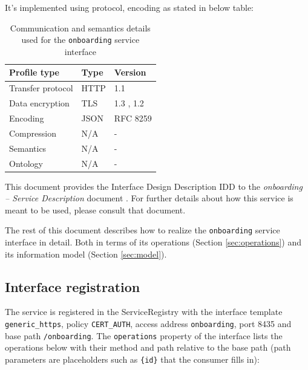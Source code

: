 \documentclass[a4paper]{arrowhead}
\begin{document}
It's implemented using protocol, encoding as stated in below table:
\begin{table}[ht!]
  \centering
  \begin{tabular}{|l|l|l|}
    \hline
    \rowcolor{gray!33} Profile type & Type & Version \\ \hline
    Transfer protocol & HTTP & 1.1 \cite{rfc9112} \\ \hline
    Data encryption & TLS & 1.3 \cite{rfc8446}, 1.2 \cite{rfc5246} \\ \hline
    Encoding & JSON & RFC 8259 \cite{rfc8259} \\ \hline
    Compression & N/A & - \\ \hline
    Semantics & N/A & - \\ \hline
    Ontology & N/A & - \\ \hline
  \end{tabular}
  \caption{Communication and semantics details used for the \texttt{onboarding} service interface}
  \label{tab:comunication_semantics_profile}
\end{table}

This document provides the Interface Design Description IDD to the \textit{onboarding -- Service Description} document \cite{onb-onboarding-sd}.
For further details about how this service is meant to be used, please consult that document.

The rest of this document describes how to realize the \texttt{onboarding} service
interface in detail. Both in terms of its operations (Section \ref{sec:operations}) and its information model (Section \ref{sec:model}).

\subsection{Interface registration}

The service is registered in the ServiceRegistry with the interface template \texttt{generic\_\allowbreak{}https}, policy \texttt{CERT\_\allowbreak{}AUTH}, access address \texttt{onboarding}, port 8435 and base path \texttt{/\allowbreak{}onboarding}. The \texttt{operations} property of the interface lists the operations below with their method and path relative to the base path (path parameters are placeholders such as \texttt{\{id\}} that the consumer fills in):
\end{document}
